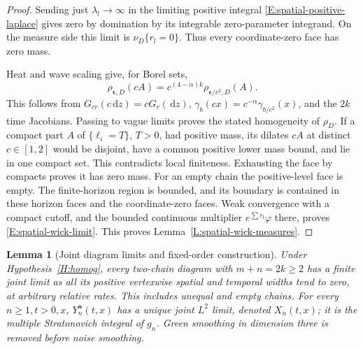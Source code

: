 \documentclass[12pt]{article}
\numberwithin{equation}{section}
\newtheorem{lemma}[theorem]{Lemma}
\theoremstyle{definition}
\newcommand{\ud}{\,\mathrm{d}}
\begin{document}
\begin{proof}
  Sending just $\lambda_l\to\infty$ in the limiting positive integral
  \eqref{E:spatial-positive-laplace} gives zero by domination by its
  integrable zero-parameter integrand. On the measure side this limit
  is $\nu_D\{r_l=0\}$. Thus every coordinate-zero face has zero mass.

  Heat and wave scaling give, for Borel sets,
  \[
    \rho_{\boldsymbol\epsilon,D}(cA)
    =c^{(4-\alpha)k}\rho_{\boldsymbol\epsilon/c^2,D}(A).
  \]
  This follows from $G_{cr}(c\ud z)=cG_r(\ud z)$,
  $\gamma_b(cx)=c^{-\alpha}\gamma_{b/c^2}(x)$, and the $2k$ time
  Jacobians. Passing to vague limits proves the stated homogeneity
  of $\rho_D$.
  If a compact part $A$ of $\{\ell_i=T\}$, $T>0$, had positive mass,
  its dilates $cA$ at distinct $c\in[1,2]$ would be disjoint, have a
  common positive lower mass bound, and lie in one compact set.
  This contradicts local finiteness. Exhausting the face by compacts
  proves it has zero mass. For an empty chain the positive-level face
  is empty. The finite-horizon region is bounded, and its boundary is
  contained in these horizon faces and the coordinate-zero faces.
  Weak convergence with a compact cutoff, and the bounded continuous
  multiplier $e^{\sum r_l}\varphi$ there, proves
  \eqref{E:spatial-wick-limit}.
  This proves Lemma~\ref{L:spatial-wick-measures}.
\end{proof}

\begin{lemma}[Joint diagram limits and fixed-order construction]
  \label{L:joint-fixed-order}
  Under Hypothesis~\ref{H:homog}, every two-chain diagram with
  $m+n=2k\ge2$ has a finite joint limit as all its positive vertexwise
  spatial and temporal widths tend to zero, at arbitrary relative rates.
  This includes unequal and empty chains. For every $n\ge1,t>0,x$,
  $Y_n^{\boldsymbol a}(t,x)$ has a unique joint $L^2$ limit, denoted
  $X_n(t,x)$; it is the multiple Stratonovich integral of $g_n$.
  Green smoothing in dimension three is removed before noise smoothing.
\end{lemma}
\end{document}
